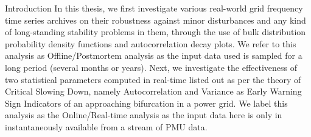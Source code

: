\begin{frame}{Introduction}
		In this thesis, we first investigate various real-world grid frequency time series archives on their robustness against minor disturbances and any kind of long-standing stability problems in them, through the use of bulk distribution probability density functions and autocorrelation decay plots. We refer to this analysis as Offline/Postmortem analysis as the input data used is sampled for a long period (several months or years). Next, we investigate the effectiveness of two statistical parameters computed in real-time listed out as per the theory of Critical Slowing Down, namely Autocorrelation and Variance as Early Warning Sign Indicators of an approaching bifurcation in a power grid. We label this analysis as the Online/Real-time analysis as the input data here is only in instantaneously available from a stream of PMU data.
\end{frame}	